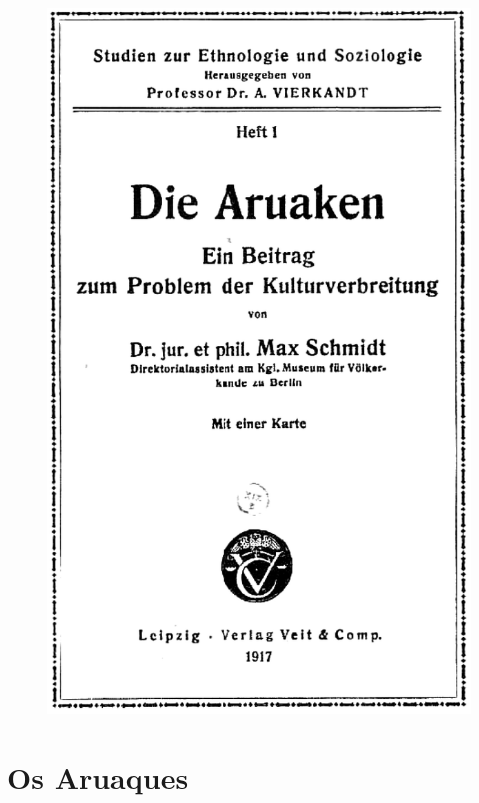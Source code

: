\pagebreak
\thispagestyle{empty}

\begin{figure}[H]
\begin{absolutelynopagebreak}
  \includegraphics[width=\textwidth]{./FRONTISPICIO.pdf}  

\end{absolutelynopagebreak}
\end{figure}

\part{Os Aruaques}

